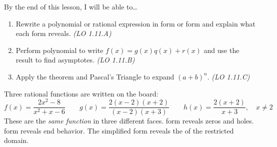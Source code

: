 \documentclass[10pt]{article}
\begin{document}
\namedateperiod

\vspace{0.08in}

\begin{objectivebox}
By the end of this lesson, I will be able to\ldots
\begin{enumerate}[itemsep=2pt]
  \item Rewrite a polynomial or rational expression in \blank{3cm} form or \blank{3cm} form
        and explain what each form reveals. \hfill\textit{(LO 1.11.A)}
  \item Perform polynomial \blank{3.5cm} to write $f(x) = g(x)q(x) + r(x)$ and use the result
        to find \blank{3cm} asymptotes. \hfill\textit{(LO 1.11.B)}
  \item Apply the \blank{3cm} theorem and Pascal's Triangle to expand $(a+b)^n$. \hfill\textit{(LO 1.11.C)}
\end{enumerate}
\end{objectivebox}

\vspace{0.06in}

\begin{vocabbox}
\end{vocabbox}

\vspace{0.06in}

\begin{hookbox}
Three rational functions are written on the board:
\[
  f(x) = \frac{2x^2 - 8}{x^2 + x - 6}
  \qquad
  g(x) = \frac{2(x-2)(x+2)}{(x-2)(x+3)}
  \qquad
  h(x) = \frac{2(x+2)}{x+3}, \quad x \ne 2
\]
These are the \textit{same function} in three different faces. \blank{4cm} form reveals zeros and
holes. \blank{4cm} form reveals end behavior. The simplified form reveals the \blank{3cm} of the
restricted domain.
\end{hookbox}

\vspace{0.06in}
\end{document}
